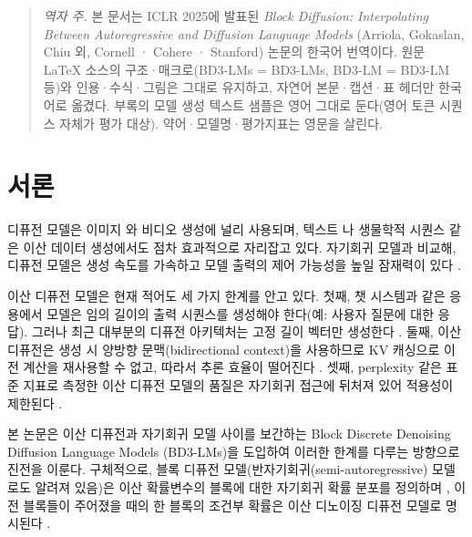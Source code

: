 \documentclass{article} %
\def\algofull{Block Discrete Denoising Diffusion Language Models}
\def\algos{BD3-LMs}
\def\algo{BD3-LM}
\begin{document}
\begin{quote}
\textit{역자 주.} 본 문서는 ICLR 2025에 발표된 \emph{Block Diffusion: Interpolating Between Autoregressive and Diffusion Language Models} (Arriola, Gokaslan, Chiu 외, Cornell · Cohere · Stanford) 논문의 한국어 번역이다. 원문 LaTeX 소스의 구조·매크로(\algos{} = BD3-LMs, \algo{} = BD3-LM 등)와 인용·수식·그림은 그대로 유지하고, 자연어 본문·캡션·표 헤더만 한국어로 옮겼다. 부록의 모델 생성 텍스트 샘플은 영어 그대로 둔다(영어 토큰 시퀀스 자체가 평가 대상). 약어·모델명·평가지표는 영문을 살린다.
\end{quote}

\section{서론}
디퓨전 모델은 이미지 \citep{ho2020denoising,dhariwal2021diffusionmodelsbeatgans,sahoo2024diffusion}와 비디오 \citep{ho2022video,gupta2023photorealisticvideogenerationdiffusion} 생성에 널리 사용되며, 텍스트 \citep{lou2024discrete, sahoo2024simple}나 생물학적 시퀀스 \citep{avdeyev2023dirichlet, goel2024memdlm} 같은 이산 데이터 생성에서도 점차 효과적으로 자리잡고 있다. 자기회귀 모델과 비교해, 디퓨전 모델은 생성 속도를 가속하고 모델 출력의 제어 가능성을 높일 잠재력이 있다 \citep{schiff2024discreteguidance, nisonoff2024unlocking, li2024derivative,sahoo2024zeroorder}.

이산 디퓨전 모델은 현재 적어도 세 가지 한계를 안고 있다. 첫째, 챗 시스템과 같은 응용에서 모델은 임의 길이의 출력 시퀀스를 생성해야 한다(예: 사용자 질문에 대한 응답). 그러나 최근 대부분의 디퓨전 아키텍처는 고정 길이 벡터만 생성한다 \citep{austin2021structured,lou2024discrete}. 둘째, 이산 디퓨전은 생성 시 양방향 문맥(bidirectional context)을 사용하므로 KV 캐싱으로 이전 계산을 재사용할 수 없고, 따라서 추론 효율이 떨어진다 \citep{israel2025enabling}. 셋째, perplexity 같은 표준 지표로 측정한 이산 디퓨전 모델의 품질은 자기회귀 접근에 뒤처져 있어 적용성이 제한된다 \citep{gulrajani2024plaid,sahoo2024simple}.

본 논문은 이산 디퓨전과 자기회귀 모델 사이를 보간하는 \algofull{} (\algos{})을 도입하여 이러한 한계를 다루는 방향으로 진전을 이룬다. 구체적으로, 블록 디퓨전 모델(반자기회귀(semi-autoregressive) 모델로도 알려져 있음)은 이산 확률변수의 블록에 대한 자기회귀 확률 분포를 정의하며 \citep{siautoregressive,si2023semi}, 이전 블록들이 주어졌을 때의 한 블록의 조건부 확률은 이산 디노이징 디퓨전 모델로 명시된다 \citep{austin2021structured,sahoo2024simple}.

\end{document}
